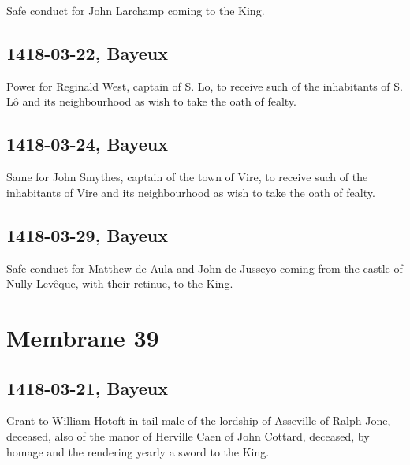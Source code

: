 \documentclass[a4paper,12pt,twoside]{book}
\begin{document}
                
                     Safe conduct for John Larchamp coming to the King.
                  
                
                \subsection{1418-03-22, Bayeux}
                
                
                     Power for Reginald West, captain of S. Lo, to receive such of the inhabitants of S. Lô and its neighbourhood as wish to take the oath of fealty.
                  
                
                \subsection{1418-03-24, Bayeux}
                
                
                     Same for John Smythes, captain of the town of Vire, to receive such of the inhabitants of Vire and its neighbourhood as wish to take the oath of fealty.
                  
                
                \subsection{1418-03-29, Bayeux}
                
                
                     Safe conduct for Matthew de Aula and John de Jusseyo coming from the castle of Nully-Levêque, with their retinue, to the King.
                  
                \newpage
            
            
            \section{Membrane 39}
            
            
                
                \subsection{1418-03-21, Bayeux}
                
                
                  Grant to William Hotoft in tail male of the lordship of Asseville of Ralph Jone, deceased, also of the manor of Herville Caen of John Cottard, deceased, by homage and the rendering yearly a sword to the King.
               
\end{document}
